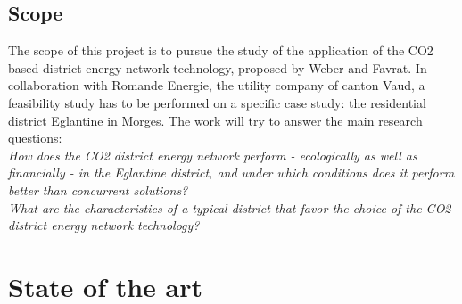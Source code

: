 \documentclass{article}
\begin{document}

\subsection{Scope}
The scope of this project is to pursue the study of the application of the CO2 based district energy network technology, proposed by Weber and Favrat\cite{weberConventionalAdvancedCO22010a}. In collaboration with Romande Energie, the utility company of canton Vaud, a feasibility study has to be performed on a specific case study: the residential district Eglantine in Morges. The work will try to answer the main research questions:\\

\textit{How does the CO2 district energy network perform - ecologically as well as financially - in the Eglantine district, and under which conditions does it perform better than concurrent solutions?}\\

\textit{What are the characteristics of a typical district that favor the choice of the CO2 district energy network technology?}


\section{State of the art}
\end{document}
